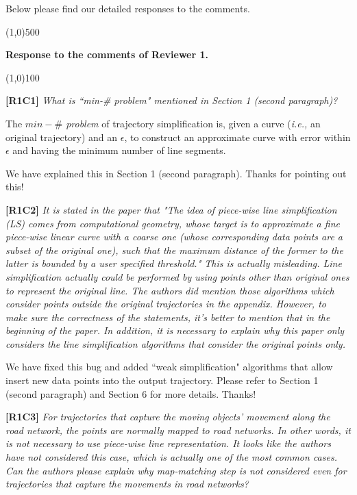 \documentclass{letter}
\newcommand{\ie}{\emph{i.e.,}\xspace}
\begin{document}
Below please find our detailed responses to the comments.



\line(1,0){500}

\textbf{Response to the comments of Reviewer 1.}

\line(1,0){100}


\textbf{[R1C1]} \emph{What is ``min-\# problem" mentioned in Section 1 (second paragraph)?}

The \emph{$min-\#$ problem} of trajectory simplification is, given a curve (\ie an original trajectory) and an $\epsilon$, to construct an approximate curve with error within $\epsilon$ and having the minimum number of line segments.

We have explained this in Section 1 (second paragraph). Thanks for pointing out this!

\textbf{[R1C2]} \emph{It is stated in the paper that "The idea of piece-wise line simplification (LS) comes from computational geometry, whose target is to approximate a fine piece-wise linear curve with a coarse one (whose corresponding data points are a subset of the original one), such that the maximum distance of the former to the latter is bounded by a user specified threshold." This is actually misleading. Line simplification actually could be performed by using points other than original ones to represent the original line. The authors did mention those algorithms which consider points outside the original trajectories in the appendix. However, to make sure the correctness of the statements, it's better to mention that in the beginning of the paper. In addition, it is necessary to explain why this paper only considers the line simplification algorithms that consider the original points only. }

We have fixed this bug and added ``weak simplification" algorithms that allow insert new data points into the output trajectory. Please refer to Section 1 (second paragraph) and Section 6 for more details.
Thanks!

\textbf{[R1C3]} \emph{ For trajectories that capture the moving objects' movement along the road network, the points are normally mapped to road networks. In other words, it is not necessary to use piece-wise line representation. It looks like the authors have not considered this case, which is actually one of the most common cases. Can the authors please explain why map-matching step is not considered even for trajectories that capture the movements in road networks? }
\end{document}
